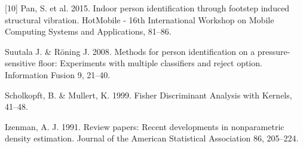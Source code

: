 \documentclass[11pt,letter]{article}
\begin{document}
\begin{multicols*}{2}
{[10] Pan, S. et al. 2015. Indoor person identification through footstep induced structural vibration. HotMobile - 16th International Workshop on Mobile Computing Systems and Applications, 81–86. \par 
[11] Suutala J. \& R\"{o}ning J. 2008. Methods for person identification on a pressure-sensitive floor: Experiments with multiple classifiers and reject option. Information Fusion 9, 21–40.\par 
[12] Scholkopft, B. \& Mullert, K. 1999. Fisher Discriminant Analysis with Kernels, 41–48. \par 
[13] Izenman, A. J. 1991. Review papers: Recent developments in nonparametric density estimation. Journal of the American Statistical Association 86, 205–224. \par
}







\end{multicols*}
\end{document}
